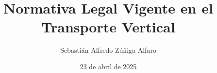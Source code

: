 
\title[NCh 440/1 – 2014]{Normativa Legal Vigente en el Transporte Vertical}

\author[S.\ Zúñiga]{Sebastián Alfredo Zúñiga Alfaro}


\date[23/4/25]{23 de abril de 2025}
